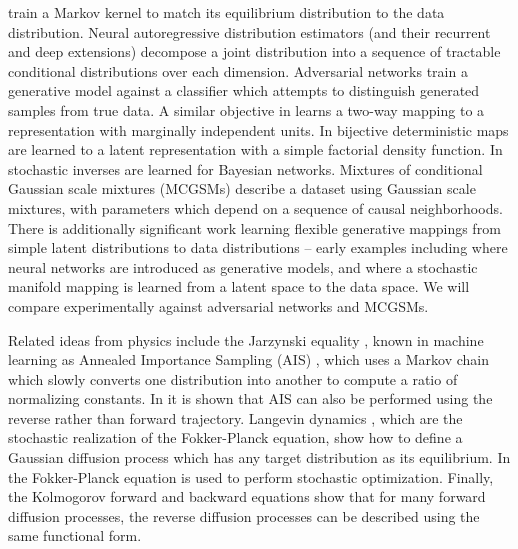 \documentclass{article}
\begin{document}
train a Markov kernel to match its equilibrium distribution to the data distribution. 
Neural autoregressive distribution estimators \cite{Larochelle2011} (and their recurrent \cite{Uria2013} and deep \cite{Uria2013a} extensions) decompose 
a joint distribution into a sequence of tractable conditional distributions over each dimension. 
Adversarial networks \cite{goodfellowgenerative} train a generative model against a classifier which attempts to 
distinguish generated samples from true data. 
A similar objective in \cite{Schmidhuber1992} learns a two-way mapping to a representation with marginally independent units.
In \cite{Rippel2013,Dinh2014} bijective deterministic maps are learned to a latent representation with a simple factorial density function.
In \cite{Stuhlmuller2013} stochastic inverses are learned for Bayesian networks.
Mixtures of conditional Gaussian scale mixtures (MCGSMs) \cite{theis2012mixtures} 
describe a dataset using Gaussian scale mixtures, with parameters 
which depend on a sequence of causal neighborhoods. 
There is additionally significant work learning flexible generative mappings from simple latent distributions to 
data distributions -- early examples including \cite{MacKay1995} where neural networks are introduced as generative models, and 
\cite{Bishop1998} where a stochastic manifold mapping is learned from a latent space to the data space. 
We will compare experimentally against adversarial networks and MCGSMs.

Related ideas from physics include the Jarzynski equality \cite{Jarzynski:1997p12846}, known in machine learning as Annealed Importance Sampling (AIS) \cite{Neal:AIS},
which uses a 
Markov chain which slowly converts one distribution into another to compute a 
ratio of normalizing constants. 
In \cite{Burda2014} it is shown that AIS can also be performed using the reverse rather than forward trajectory.
Langevin dynamics \cite{langevin1908theorie}, which are the stochastic realization of the Fokker-Planck equation, show how 
to define a 
Gaussian diffusion process which has any target distribution as its equilibrium. In \cite{Suykens1995} the Fokker-Planck equation is used to perform stochastic optimization. 
Finally, the Kolmogorov forward and backward equations \cite{feller1949theory} show that for many forward diffusion processes, 
the reverse diffusion processes can be described using the same functional form.
\end{document}
